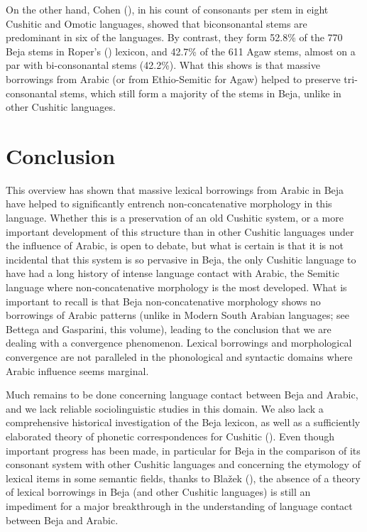 \documentclass[output=paper]{langsci/langscibook}
\begin{document}
On the other hand, Cohen (\citeyear[256]{Cohen1988}), in his count of consonants per stem in eight Cushitic and Omotic languages, showed that biconsonantal stems are predominant in six of the languages. By contrast, they form 52.8\% of the 770 Beja stems in Roper's (\citeyear{Roper1928}) lexicon, and 42.7\% of the 611 Agaw stems, almost on a par with bi-consonantal stems (42.2\%). What this shows is that massive borrowings from Arabic (or from Ethio-Semitic for Agaw) helped to preserve tri-consonantal stems, which still form a majority of the stems in Beja, unlike in other Cushitic languages.

\section{Conclusion}

This overview has shown that massive lexical borrowings from Arabic in Beja have helped to significantly entrench non-concatenative morphology in this language. Whether this is a preservation of an old Cushitic system, or a more important development of this structure than in other Cushitic languages under the influence of Arabic, is open to debate, but what is certain is that it is not incidental that this system is so pervasive in Beja, the only Cushitic language to have had a long history of intense language contact with Arabic, the Semitic language where non-concatenative morphology is the most developed. What is important to recall is that Beja non-concatenative morphology shows no borrowings of Arabic patterns (unlike in Modern South Arabian languages; see Bettega and Gasparini, this volume), leading to the conclusion that we are dealing with a convergence phenomenon. Lexical borrowings and morphological convergence are not paralleled in the phonological and syntactic domains where Arabic influence seems marginal.

Much remains to be done concerning language contact between Beja and Arabic, and we lack reliable sociolinguistic studies in this domain. We also lack a comprehensive historical investigation of the Beja lexicon, as well as a sufficiently elaborated theory of phonetic correspondences for Cushitic (\citeyear[267]{Cohen1988}). Even though important progress has been made, in particular for Beja in the comparison of its consonant system with other Cushitic languages and concerning the etymology of lexical items in some semantic fields, thanks to Blažek (\citeyear{Blažek2000,Blažek2003kinship,Blažek2003fauna,Blažek2006BB2,Blažek2006BB3}), the absence of a theory of lexical borrowings in Beja (and other Cushitic languages) is still an impediment for a major breakthrough in the understanding of language contact between Beja and Arabic.
\end{document}
